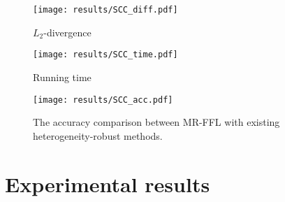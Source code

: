\documentclass[lettersize,journal]{IEEEtran}
\begin{document}
\begin{figure}[tb]
	\begin{minipage}[!t]{0.49\linewidth}
		\centering
		\texttt{[image: results/SCC\_diff.pdf]}
		\caption{$L_2$-divergence}
		\label{results:1-diff}
	\end{minipage}
        \begin{minipage}[!t]{0.49\linewidth}
		\centering
		\texttt{[image: results/SCC\_time.pdf]}
		\caption{Running time}
		\label{results:1-time}
	\end{minipage}
\end{figure} 

\begin{figure}[!t]
\centering
\texttt{[image: results/SCC\_acc.pdf]}
\caption{The accuracy comparison between MR-FFL with existing heterogeneity-robust methods.}
\label{results:1-acc}
\end{figure}

\section{Experimental results}
\end{document}
